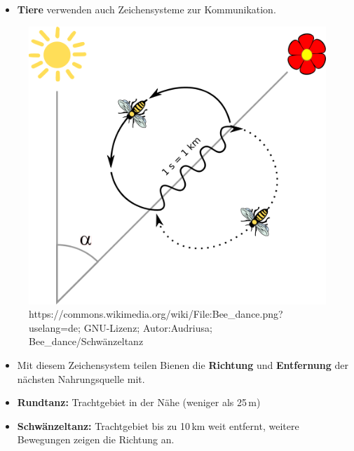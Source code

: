 \begin{frame}

\begin{itemize}
	\item<1-> \textbf{Tiere} verwenden auch Zeichensysteme zur Kommunikation.
\end{itemize}			
			



\begin{figure}[H]
\centering
\includegraphics[scale=0.14]{material/Bee-dance}
\caption{https://commons.wikimedia.org/wiki/File:Bee\_dance.png?uselang=de; GNU-Lizenz; Autor:Audriusa; Bee\_dance/Schwänzeltanz}
\label{Zeichen2}
\end{figure}

\begin{itemize}
	\item<2-> Mit diesem Zeichensystem teilen Bienen die \textbf{Richtung} und \textbf{Entfernung} der nächsten Nahrungsquelle mit. 
	\item<2-> \textbf{Rundtanz:} Trachtgebiet in der Nähe (weniger als 25\,m)
	\item<2-> \textbf{Schwänzeltanz:} Trachtgebiet bis zu 10\,km weit entfernt, weitere Bewegungen zeigen die Richtung an.
\end{itemize}		
		
\end{frame}			


